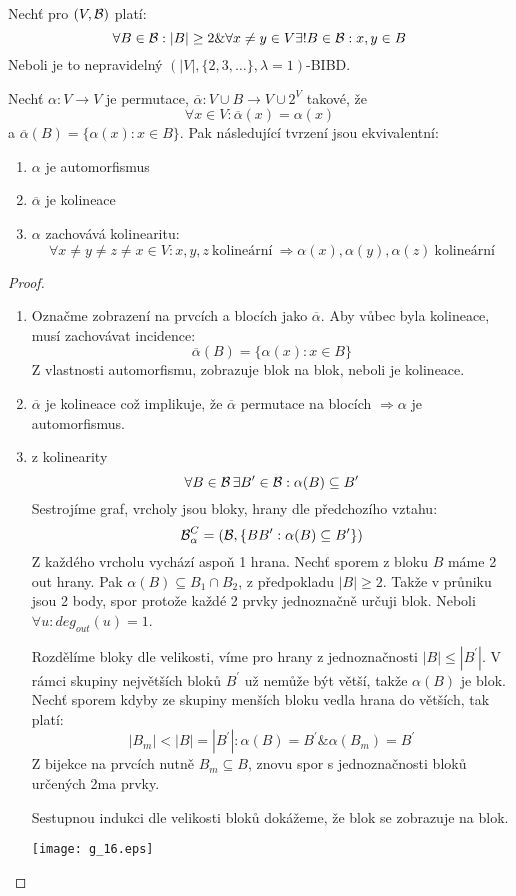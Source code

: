 \begin{theorem}\label{kpp:equiv}
    Nechť pro $(V,\operatorname{\mathcal{B}})$ platí:
    \[ \forall B \in \operatorname{\mathcal{B}}: |B| \geq 2 \& \forall x \ne y \in V \exists! B \in \operatorname{\mathcal{B}}: x, y \in B \]
    Neboli je to nepravidelný $(|V|, \{ 2, 3, \ldots \}, \lambda = 1)$-BIBD.

    Nechť $\alpha: V\rightarrow V$ je permutace, $\overline{\alpha}: V\cup B\rightarrow V\cup 2^V$ takové, že
    \[ \forall x \in V: \overline{\alpha}(x) = \alpha(x) \]
    a $\overline{\alpha}(B) = \{ \alpha(x): x \in B \}$.
    Pak následující tvrzení jsou ekvivalentní:
    \begin{enumerate}
        \item $\alpha$ je automorfismus
        \item $\overline{\alpha}$ je kolineace
        \item $\alpha$ zachovává kolinearitu:
		\[ \forall x \ne y \ne z \ne x \in V: x, y, z\ \text{kolineární}\ \Rightarrow \alpha(x), \alpha(y), \alpha(z)\ \text{kolineární} \]
    \end{enumerate}
\end{theorem}
\begin{proof}
    \begin{enumerate}
        \item Označme zobrazení na prvcích a blocích jako $\overline{\alpha}$.
		Aby vůbec byla kolineace, musí zachovávat incidence:
		\[ \overline{\alpha}(B) = \{ \alpha(x): x \in B \} \]
		Z vlastnosti automorfismu, zobrazuje blok na blok, neboli je kolineace.
        \item $\overline{\alpha}$ je kolineace což implikuje, že $\overline{\alpha}$ permutace na blocích $\Rightarrow \alpha$ je automorfismus.
        \item z kolinearity
		\[ \forall B \in \operatorname{\mathcal{B}} \exists B^{\prime} \in \operatorname{\mathcal{B}}: \alpha(B) \subseteq B^{\prime} \]
		Sestrojíme graf, vrcholy jsou bloky, hrany dle předchozího vztahu:
		\[ \operatorname{\mathcal{B}}_{\alpha}^C = (\operatorname{\mathcal{B}}, \{ BB^{\prime}: \alpha(B) \subseteq B^{\prime}\}) \]
		Z každého vrcholu vychází aspoň 1 hrana.
		Nechť sporem z bloku $B$ máme 2 out hrany.
		Pak $\alpha(B) \subseteq B_1 \cap B_2$, z předpokladu $|B| \geq 2$.
		Takže v průniku jsou 2 body, spor protože každé 2 prvky jednoznačně určuji blok.
		Neboli $\forall u: deg_{out}(u) = 1$.

		Rozdělíme bloky dle velikosti, víme pro hrany z jednoznačnosti $|B| \leq |B^{\prime}|$.
		V rámci skupiny největších bloků $B^{\prime}$ už nemůže být větší, takže $\alpha(B)$ je blok.
		Nechť sporem kdyby ze skupiny menších bloku vedla hrana do větších, tak platí:
		\[ |B_m| < |B| = |B^{\prime}|: \alpha(B) = B^{\prime} \& \alpha(B_m) = B^{\prime} \]
		Z bijekce na prvcích nutně $B_m \subseteq B$, znovu spor s jednoznačnosti bloků určených 2ma prvky.

		Sestupnou indukci dle velikosti bloků dokážeme, že blok se zobrazuje na blok.

    	\texttt{[image: g\_16.eps]}
    \end{enumerate}
\end{proof}

